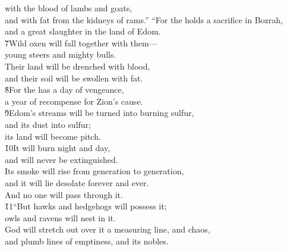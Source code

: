 \begin{poetry}
\poeml with the blood of lambs and goats, \\
\poemll    and with fat from the kidneys of rams.''
\poeml ``For the  holds a sacrifice in Bozrah, \\
\poemll    and a great slaughter in the land of Edom. \\
\poeml \v{7}Wild oxen will fall together with them--- \\
\poemll    young steers and mighty bulls. \\
\poeml Their land will be drenched with blood, \\
\poemll    and their soil will be swollen with fat. \\
\poeml \v{8}For the  has a day of vengeance, \\
\poemll    a year of recompense for Zion's cause. \\
\poeml \v{9}Edom's streams will be turned into burning sulfur, \\
\poemll    and its dust into sulfur; \\
\poemlll       its land will become pitch. \\
\poeml \v{10}It will burn night and day, \\
\poemll    and will never be extinguished. \\
\poeml Its smoke will rise from generation to generation, \\
\poemll    and it will lie desolate forever and ever. \\
\poemlll       And no one will pass through it. \\
\poeml \v{11}``But hawks and hedgehogs will possess it; \\
\poemll    owls and ravens will nest in it. \\
\poeml God will stretch out over it a measuring line, and chaos, \\
\poemll    and plumb lines of emptiness, and its nobles. \\

\end{poetry}
